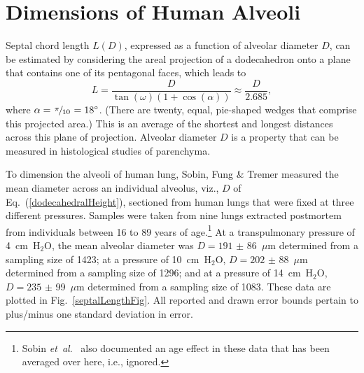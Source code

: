 \section{Dimensions of Human Alveoli}
\label{alveolarSize}

Septal chord length $L(D)$, expressed as a function of alveolar diameter $D$, can be estimated by considering the areal projection of a dodecahedron onto a plane that contains one of its pentagonal faces, which leads to
\begin{equation}
	L = \frac{D}{\tan ( \omega ) ( 1 + \cos ( \alpha ) )} 
	\approx  \frac{D}{2.685} ,
\label{dodecahedralHeight}
\end{equation} 
where $\alpha = \textfrac{\pi}{10} = 18^{\circ}$.  (There are twenty, equal, pie-shaped wedges that comprise this projected area.)  This is an average of the shortest and longest distances across this plane of projection.  Alveolar diameter $D$ is a property that can be measured in histological studies of parenchyma.  

To dimension the alveoli of human lung, Sobin, Fung \& Tremer \cite{Sobinetal88} measured the mean diameter across an individual alveolus, viz., $D$ of Eq.~(\ref{dodecahedralHeight}),  sectioned from human lungs that were fixed at three different pressures.  Samples were taken from nine lungs extracted postmortem from individuals between 16 to 89 years of age.\footnote{%
	Sobin \textit{et~al}.\ \cite{Sobinetal88} also documented an age effect in these data that has been averaged over here, i.e., ignored.
}
At a transpulmonary pressure of 4~cm~$\text{H}_2$O, the mean alveolar diameter was $D = 191$ $\pm$ 86~$\mu$m determined from a sampling size of 1423; at a pressure of 10~cm~$\text{H}_2$O, $D = 202$ $\pm$ 88~$\mu$m determined from a sampling size of 1296; and at a pressure of 14~cm~$\text{H}_2$O, $D = 235$ $\pm$ 99~$\mu$m determined from a sampling size of 1083.  These data are plotted in Fig.~\ref{septalLengthFig}.  All reported and drawn error bounds pertain to plus\slash minus one standard deviation in error.

